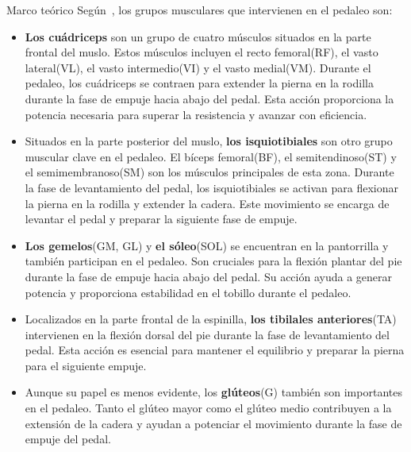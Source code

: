 \begin{thesischapter}{1} {Marco teórico}
    \vspace{10pt}
    Según~\cite{Losmúscu21}, los grupos musculares que intervienen en el pedaleo son:

    \begin{itemize}
        \item \textbf{Los cuádriceps} son un grupo de cuatro músculos situados en la parte frontal del muslo. 
        Estos músculos incluyen el recto femoral(RF), el vasto lateral(VL), el vasto intermedio(VI) y el vasto medial(VM). Durante el pedaleo, los cuádriceps se contraen para extender la pierna en 
        la rodilla durante la fase de empuje hacia abajo del pedal. Esta acción proporciona la potencia necesaria para superar la resistencia y avanzar con eficiencia.
        
        \item Situados en la parte posterior del muslo, \textbf{los isquiotibiales} son otro grupo muscular clave en el pedaleo. El bíceps femoral(BF), 
        el semitendinoso(ST) y el semimembranoso(SM) son los músculos principales de esta zona. Durante la fase de levantamiento del pedal, los isquiotibiales se activan para flexionar la pierna en la rodilla y extender 
        la cadera. Este movimiento se encarga de levantar el pedal y preparar la siguiente fase de empuje.
        
        \item \textbf{Los gemelos}(GM, GL) y \textbf{el sóleo}(SOL) se encuentran en la pantorrilla y también participan en el pedaleo. Son cruciales para la flexión plantar del pie durante la fase de 
        empuje hacia abajo del pedal. Su acción ayuda a generar potencia y proporciona estabilidad en el tobillo durante el pedaleo.
        
        \item Localizados en la parte frontal de la espinilla, \textbf{los tibilales anteriores}(TA) intervienen en la flexión dorsal del pie durante la fase de levantamiento del pedal. Esta acción es 
        esencial para mantener el equilibrio y preparar la pierna para el siguiente empuje.
        
        \item Aunque su papel es menos evidente, los \textbf{glúteos}(G) también son importantes en el pedaleo. Tanto el glúteo mayor como el glúteo medio contribuyen a la extensión de la cadera y ayudan
         a potenciar el movimiento durante la fase de empuje del pedal.
    \end{itemize}



\end{thesischapter}
